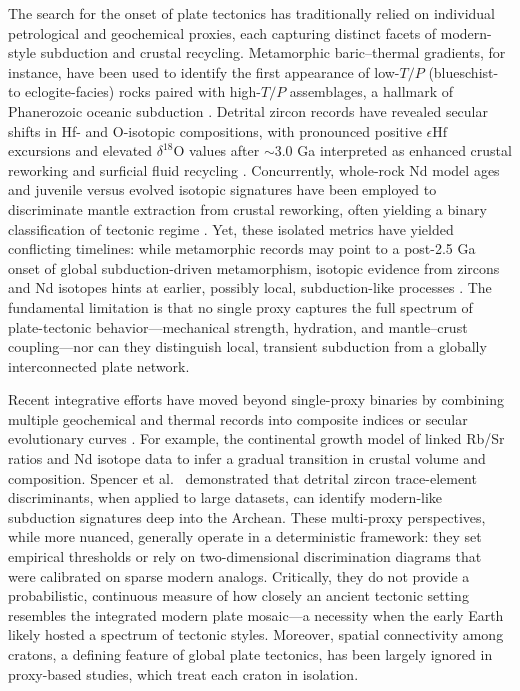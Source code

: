 \documentclass{article}
\begin{document}
The search for the onset of plate tectonics has traditionally relied on individual petrological and geochemical proxies, each capturing distinct facets of modern-style subduction and crustal recycling. Metamorphic baric–thermal gradients, for instance, have been used to identify the first appearance of low-\(T/P\) (blueschist- to eclogite-facies) rocks paired with high-\(T/P\) assemblages, a hallmark of Phanerozoic oceanic subduction \cite{brown2007metamorphic,holder2019paired}. Detrital zircon records have revealed secular shifts in Hf- and O-isotopic compositions, with pronounced positive \(\epsilon\text{Hf}\) excursions and elevated \(\delta^{18}\text{O}\) values after \(\sim\)3.0 Ga interpreted as enhanced crustal reworking and surficial fluid recycling \cite{cawood2006zircon,valley2005oxygen}. Concurrently, whole-rock Nd model ages and juvenile versus evolved isotopic signatures have been employed to discriminate mantle extraction from crustal reworking, often yielding a binary classification of tectonic regime \cite{hawkesworth2010generation}. Yet, these isolated metrics have yielded conflicting timelines: while metamorphic records may point to a post-2.5 Ga onset of global subduction-driven metamorphism, isotopic evidence from zircons and Nd isotopes hints at earlier, possibly local, subduction-like processes \cite{palin2020onset}. The fundamental limitation is that no single proxy captures the full spectrum of plate-tectonic behavior—mechanical strength, hydration, and mantle–crust coupling—nor can they distinguish local, transient subduction from a globally interconnected plate network.

Recent integrative efforts have moved beyond single-proxy binaries by combining multiple geochemical and thermal records into composite indices or secular evolutionary curves \cite{dhuime2012continental,tang2016continental}. For example, the continental growth model of \cite{dhuime2012continental} linked Rb/Sr ratios and Nd isotope data to infer a gradual transition in crustal volume and composition. Spencer et al.~\cite{spencer2017crucial} demonstrated that detrital zircon trace-element discriminants, when applied to large datasets, can identify modern-like subduction signatures deep into the Archean. These multi-proxy perspectives, while more nuanced, generally operate in a deterministic framework: they set empirical thresholds or rely on two-dimensional discrimination diagrams that were calibrated on sparse modern analogs. Critically, they do not provide a probabilistic, continuous measure of how closely an ancient tectonic setting resembles the integrated modern plate mosaic—a necessity when the early Earth likely hosted a spectrum of tectonic styles. Moreover, spatial connectivity among cratons, a defining feature of global plate tectonics, has been largely ignored in proxy-based studies, which treat each craton in isolation.
\end{document}
